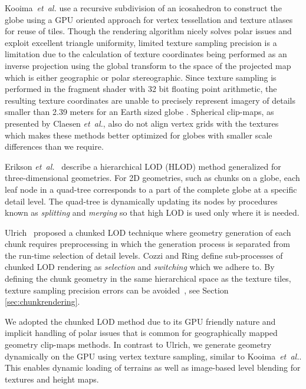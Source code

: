 \documentclass[journal]{vgtc}                %
\newcommand{\etal}{\emph{et~al.}}
\begin{document}
Kooima~\etal\cite{kooima2009planetary} use a recursive subdivision of an icosahedron to construct the globe using a GPU oriented approach for vertex tessellation and texture atlases for reuse of tiles. Though the rendering algorithm nicely solves polar issues and exploit excellent triangle uniformity, limited texture sampling precision is a limitation due to the calculation of texture coordinates being performed as an inverse projection using the global transform to the space of the projected map which is either geographic or polar stereographic. Since texture sampling is performed in the fragment shader with 32 bit floating point arithmetic, the resulting texture coordinates are unable to precisely represent imagery of details smaller than 2.39 meters for an Earth sized globe \cite{kooima2009planetary}.
Spherical clip-maps, as presented by Claesen \etal \cite{clasen2006terrain}, also do not align vertex grids with the textures which makes these methods better optimized for globes with smaller scale differences than we require.

Erikson \etal~\cite{Erikson:2001:HFD:364338.364376} describe a hierarchical LOD (HLOD) method generalized for three-dimensional geometries. For 2D geometries, such as chunks on a globe, each leaf node in a quad-tree corresponds to a part of the complete globe at a specific detail level.
The quad-tree is dynamically updating its nodes by procedures known as \emph{splitting} and \emph{merging} so that high LOD is used only where it is needed.

Ulrich~\cite{ulrich2002rendering} proposed a chunked LOD technique where geometry generation of each chunk requires preprocessing in which the generation process is separated from the run-time selection of detail levels. Cozzi and Ring \cite{cozzi20113d} define sub-processes of chunked LOD rendering as \emph{selection} and \emph{switching} which we adhere to. By defining the chunk geometry in the same hierarchical space as the texture tiles, texture sampling precision errors can be avoided~\cite{cozzi20113d}, see Section \ref{sec:chunkrendering}. 


We adopted the chunked LOD method due to its GPU friendly nature and implicit handling of polar issues that is common for geographically mapped geometry clip-maps methods. In contrast to Ulrich, we generate geometry dynamically on the GPU using vertex texture sampling, similar to Kooima~\etal\cite{kooima2009planetary}. This enables dynamic loading of terrains as well as image-based level blending for textures and height maps.
\end{document}
